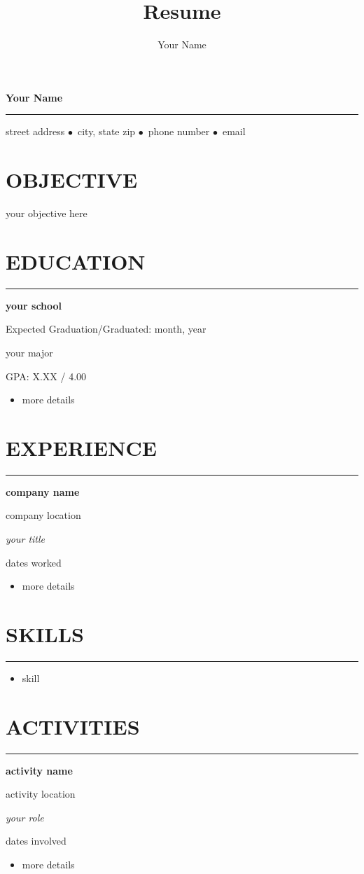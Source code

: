 \documentclass[10pt,letterpaper]{article}
\title{Resume}
\author{Your Name}
\date{}
\newcommand{\objectivewidth}{0.18\textwidth}%
\newcommand{\GapOne}{12pt}%
\newcommand{\GapTwo}{6pt}%
\newcommand{\bt}{$\bullet$}
\newcommand{\sect}[1]%
	{
	\section{{#1}}
	\hrule
	}
\newcommand{\sectlist}[1]%
	{
	\section{{#1}}
	\hrule
	\vspace{\GapTwo}%
	}
\newcommand{\school}[4]%
	{
	\vspace{\GapTwo}%
	\begin{minipage}{0.5\textwidth}
		\begin{flushleft}
			\textbf{{#1}}%
		\end{flushleft}
	\end{minipage}
	\hfill
	\begin{minipage}{0.5\textwidth}
		\begin{flushright}
			{#3}%
		\end{flushright}
	\end{minipage}

	\begin{minipage}{0.5\textwidth}
		\begin{flushleft}
			{#2}%
		\end{flushleft}
	\end{minipage}
	\hfill
	\begin{minipage}{0.5\textwidth}
		\begin{flushright}
			{#4}%
		\end{flushright}
	\end{minipage}
	}
\newcommand{\entry}[4]%
	{
	\vspace{\GapTwo}%
	\begin{minipage}{0.5\textwidth}
		\begin{flushleft}
			\textbf{{#1}}%
		\end{flushleft}
	\end{minipage}
	\hfill
	\begin{minipage}{0.5\textwidth}
		\begin{flushright}
			{#3}%
		\end{flushright}
	\end{minipage}

	\begin{minipage}{0.5\textwidth}
		\begin{flushleft}
			\textit{#2}%
		\end{flushleft}
	\end{minipage}
	\hfill
	\begin{minipage}{0.5\textwidth}
		\begin{flushright}
			{#4}%
		\end{flushright}
	\end{minipage}
	}
\begin{document}
\begin{center}
\huge \textbf{Your Name}%
\end{center}
\hrule
\vspace{3pt}
\begin{center}
\normalsize street address \bt\ city, state zip \bt\ phone number \bt\ email%
\end{center}


\begin{minipage}{\objectivewidth}
	\section{OBJECTIVE}
\end{minipage}
\hfill
\begin{minipage}{\textwidth - \objectivewidth}
	\vspace{\GapOne}
	your objective here
	\vspace{\GapOne}
\end{minipage}


\sect{EDUCATION}

\school{your school}
{your major}
{Expected Graduation/Graduated: month, year}
{GPA: X.XX / 4.00}
\begin{itemize}
\item more details
\end{itemize}


\sect{EXPERIENCE}

\entry{company name}
{your title}
{company location}
{dates worked}
\begin{itemize}
\item more details
\end{itemize}


\sectlist{SKILLS}

\begin{itemize}
\item skill
\end{itemize}


\sect{ACTIVITIES}

\entry{activity name}
{your role}
{activity location}
{dates involved}
\begin{itemize}
\item more details
\end{itemize}
\end{document}
